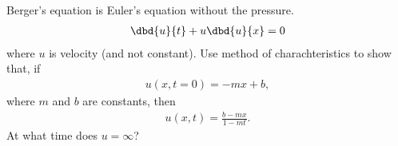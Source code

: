  Berger's equation is Euler's equation without the pressure.  
\begin{align}
\dbd{u}{t} + u \dbd{u}{x}=0
\end{align}
where $u$ is velocity (and not constant).
Use method
of charachteristics to show that, if
\begin{align}
u(x, t=0) = -m x +b,
\end{align}
where $m$ and $b$ are constants, then
\begin{align}
u(x,t) = \frac{ b-mx}{1-mt}.
\end{align}
At what time does $u=\infty$?
